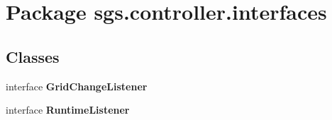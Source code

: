 \section{Package sgs.\-controller.\-interfaces}
\label{namespacesgs_1_1controller_1_1interfaces}
\subsection*{Classes}
\begin{DoxyCompactItemize}
\item 
interface {\bf Grid\-Change\-Listener}
\item 
interface {\bf Runtime\-Listener}
\end{DoxyCompactItemize}
